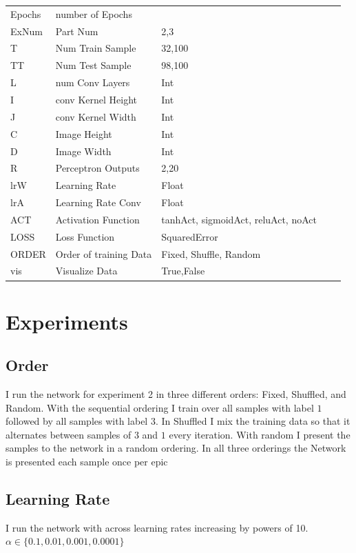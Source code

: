 \documentclass{article}
\begin{document}
\begin{table}[]
\begin{tabular}{l|llll}
 Epochs& number of Epochs    &  &  &  \\
 ExNum & Part Num            & 2,3&  &  \\
 T     & Num Train Sample    & 32,100 &  &  \\
 TT    & Num Test  Sample    & 98,100 &  & \\
 L     & num Conv Layers    & Int & \\
 I     & conv Kernel Height  & Int &  & \\
 J     & conv Kernel Width   & Int &  & \\
 C     & Image Height        & Int &  & \\
 D     & Image Width         & Int &  & \\
 R     & Perceptron Outputs  & 2,20 &  & \\
 lrW   & Learning Rate       & Float &  & \\
 lrA   & Learning Rate Conv  & Float &  & \\
 ACT   & Activation Function & tanhAct, sigmoidAct, reluAct, noAct &  & \\
 LOSS  & Loss Function       & SquaredError  &  & \\
ORDER& Order of training Data&Fixed, Shuffle, Random\\
 vis   & Visualize Data      & True,False &  & \\
\end{tabular}
\end{table}


\section{Experiments}
\subsection{Order}
I run the network for experiment 2 in three different orders: Fixed, Shuffled, and Random.  With the sequential ordering I train over all samples with label $1$ followed by all samples with label $3$.  In Shuffled I mix the training data so that it alternates between samples of $3$ and $1$ every iteration.  With random I present the samples to the network in a random ordering.  In all three orderings the Network is presented each sample once per epic

	
\subsection{Learning Rate}
I run the network with across learning rates increasing by powers of 10.
$\alpha \in \{0.1, 0.01, 0.001, 0.0001\}$
\end{document}
